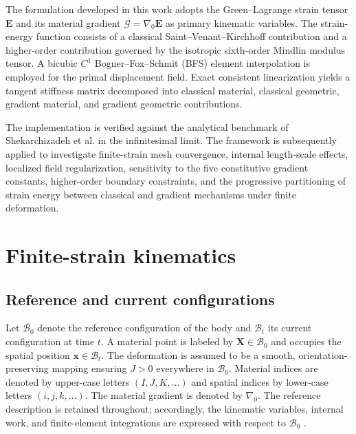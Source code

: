 \documentclass[preprint,12pt]{elsarticle}
\begin{document}
The formulation developed in this work adopts the Green--Lagrange strain
tensor $\mathbf{E}$ and its material gradient
$\bm{\mathcal{G}}=\nabla_0\mathbf{E}$ as primary kinematic variables. The
strain-energy function consists of a classical Saint--Venant--Kirchhoff
contribution and a higher-order contribution governed by the isotropic
sixth-order Mindlin modulus tensor. A bicubic $C^1$ Bogner--Fox--Schmit (BFS)
element interpolation is employed for the primal displacement field.
Exact consistent linearization yields a tangent stiffness matrix decomposed into
classical material, classical geometric, gradient material, and gradient
geometric contributions.

The implementation is verified against the analytical benchmark of
Shekarchizadeh et al. \cite{ShekarchizadehAbaliBersani2022} in the
infinitesimal limit. The framework is subsequently applied to investigate
finite-strain mesh convergence, internal length-scale effects, localized
field regularization, sensitivity to the five constitutive gradient
constants, higher-order boundary constraints, and the progressive
partitioning of strain energy between classical and gradient mechanisms
under finite deformation.

\section{Finite-strain kinematics}
\label{sec:kinematics}

\subsection{Reference and current configurations}
\label{sec:reference-current-configurations}

Let $\mathcal{B}_0$ denote the reference configuration of the body and
$\mathcal{B}_t$ its current configuration at time $t$. A material point is
labeled by $\mathbf{X}\in\mathcal{B}_0$ and occupies the spatial position
$\mathbf{x}\in\mathcal{B}_t$. The deformation is assumed to be a smooth,
orientation-preserving mapping ensuring $J>0$ everywhere in $\mathcal{B}_0$.
Material indices are denoted by upper-case letters $(I,J,K,\ldots)$ and
spatial indices by lower-case letters $(i,j,k,\ldots)$. The material
gradient is denoted by $\nabla_0$. The reference description is retained
throughout; accordingly, the kinematic variables, internal work, and
finite-element integrations are expressed with respect to
$\mathcal{B}_0$ \cite{Holzapfel2000,Ogden1997,BonetWood2008}.
\end{document}
